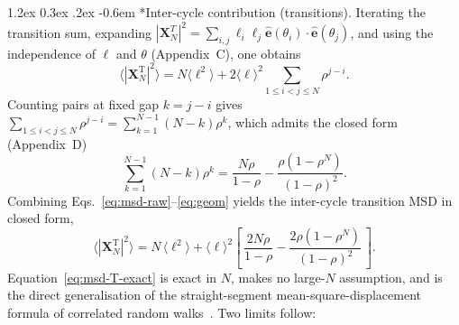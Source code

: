 \documentclass[11pt,a4paper]{article}
\makeatletter
\newenvironment{widetext}{}{}
\renewcommand\paragraph{\@startsection{paragraph}{4}{\z@}%
  {1.2ex \@plus 0.3ex \@minus .2ex}%
  {-0.6em}%
  {\normalfont\normalsize\itshape}}
\makeatother
\begin{document}
\paragraph*{Inter-cycle contribution (transitions).}
Iterating the transition sum, expanding
$|\mathbf{X}_N^{T}|^2 = \sum_{i,j}\ell_i\ell_j
\hat{\mathbf{e}}(\theta_i)\cdot\hat{\mathbf{e}}(\theta_j)$, and
using the independence of $\ell$ and $\theta$ (Appendix~C), one
obtains
\begin{equation}
\langle |\mathbf{X}_N^{\mathrm{T}}|^2 \rangle
 = N\langle \ell^2 \rangle
 + 2\langle \ell \rangle^2
   \sum_{1 \le i < j \le N} \rho^{j-i}.
\label{eq:msd-raw}
\end{equation}
Counting pairs at fixed gap $k = j-i$ gives
$\sum_{1\le i<j\le N}\rho^{j-i} = \sum_{k=1}^{N-1}(N-k)\rho^k$, which
admits the closed form (Appendix~D)
\begin{equation}
\sum_{k=1}^{N-1}(N-k)\rho^k
 = \frac{N\rho}{1-\rho} - \frac{\rho(1-\rho^N)}{(1-\rho)^2}.
\label{eq:geom}
\end{equation}
Combining Eqs.~\eqref{eq:msd-raw}--\eqref{eq:geom} yields the
inter-cycle transition MSD in closed form,
\begin{widetext}
\begin{equation}
\boxed{\;
\langle |\mathbf{X}_N^{\mathrm{T}}|^2 \rangle
 = N\,\langle \ell^2 \rangle
 + \langle \ell \rangle^2
   \left[\, \frac{2N\rho}{1-\rho}
          - \frac{2\rho(1-\rho^N)}{(1-\rho)^2} \,\right].
\;}
\label{eq:msd-T-exact}
\end{equation}
\end{widetext}
Equation~\eqref{eq:msd-T-exact} is exact in $N$, makes no large-$N$
assumption, and is the direct generalisation of the
straight-segment mean-square-displacement formula of correlated
random walks~\cite{kareiva1983}. Two limits follow:
\end{document}
